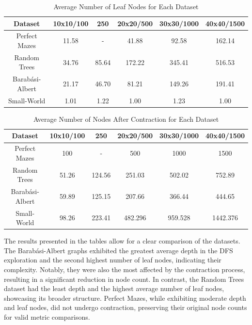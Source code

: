 \begin{table}[H]
    \centering
    \caption{Average Number of Leaf Nodes for Each Dataset}
    \label{tab:average_leaf_nodes}
    \begin{tabular}{|c|c|c|c|c|c|} 
        \hline
        \textbf{Dataset} & \textbf{10x10/100} & \textbf{250} & \textbf{20x20/500} & \textbf{30x30/1000} & \textbf{40x40/1500} \\ 
        \hline
        Perfect Mazes & 11.58 & - & 41.88 & 92.58 & 162.14 \\ 
        \hline
        Random Trees & 34.76 & 85.64 & 172.22 & 345.41 & 516.53 \\ 
        \hline
        Barabási-Albert & 21.17 & 46.70 & 81.21 & 149.26 & 191.41 \\
        \hline
        Small-World & 1.01 & 1.22 & 1.00 & 1.23 & 1.00
        \\
        \hline
    \end{tabular}
\end{table}

\begin{table}[H]
    \centering
    \caption{Average Number of Nodes After Contraction for Each Dataset}
    \label{tab:nodes_after_contraction}
    \begin{tabular}{|c|c|c|c|c|c|} 
        \hline
        \textbf{Dataset} & \textbf{10x10/100} & \textbf{250} & \textbf{20x20/500} & \textbf{30x30/1000} & \textbf{40x40/1500} \\ 
        \hline
        Perfect Mazes & 100 & - & 500 & 1000 & 1500 \\ 
        \hline
        Random Trees & 51.26 & 124.56 & 251.03 & 502.02 & 752.89 \\ 
        \hline
        Barabási-Albert & 59.89 & 125.15 & 207.66 & 366.44 & 444.65 \\
        \hline
        Small-World & 98.26 & 223.41 & 482.296 & 959.528 & 1442.376
        \\
        \hline
    \end{tabular}
\end{table}

The results presented in the tables allow for a clear comparison of the datasets. The Barabási-Albert graphs exhibited the greatest average depth in the DFS exploration and the second highest number of leaf nodes, indicating their complexity. Notably, they were also the most affected by the contraction process, resulting in a significant reduction in node count. In contrast, the Random Trees dataset had the least depth and the highest average number of leaf nodes, showcasing its broader structure. Perfect Mazes, while exhibiting moderate depth and leaf nodes, did not undergo contraction, preserving their original node counts for valid metric comparisons.

